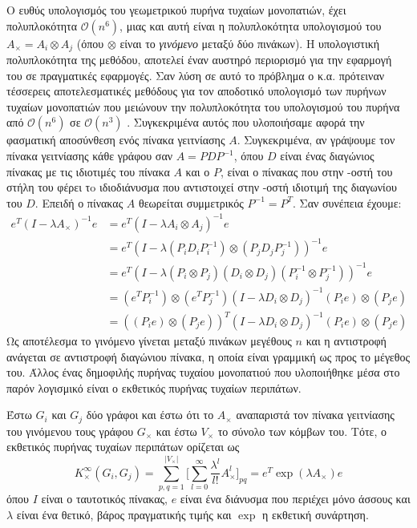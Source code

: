 Ο ευθύς υπολογισμός του γεωμετρικού πυρήνα τυχαίων μονοπατιών, έχει πολυπλοκότητα $\mathcal{O}(n^6)$, μιας και αυτή είναι η πολυπλοκότητα υπολογισμού του $A_{\times}=A_{i}\otimes A_{j}$ (όπου $\otimes$ είναι το \textit{γινόμενο } μεταξύ δύο πινάκων).
Η υπολογιστική πολυπλοκότητα της μεθόδου, αποτελεί έναν αυστηρό περιορισμό για την εφαρμογή του σε πραγματικές εφαρμογές.
Σαν λύση σε αυτό το πρόβλημα ο  κ.α. πρότειναν τέσσερεις αποτελεσματικές μεθόδους για τον αποδοτικό υπολογισμό των πυρήνων τυχαίων μονοπατιών  που μειώνουν την πολυπλοκότητα του υπολογισμού του πυρήνα από $\mathcal{O}(n^6)$ σε $\mathcal{O}(n^3)$ \cite{vishwanathan2010graph}.
Συγκεκριμένα αυτός που υλοποιήσαμε αφορά την φασματική αποσύνθεση ενός πίνακα γειτνίασης $A$.
Συγκεκριμένα, αν γράψουμε τον πίνακα γειτνίασης κάθε γράφου σαν $A=P D P^{-1}$, όπου $D$ είναι ένας διαγώνιος πίνακας με τις ιδιοτιμές του πίνακα $Α$ και ο $P$, είναι ο πίνακας που στην -οστή του στήλη του φέρει τo ιδιοδιάνυσμα που αντιστοιχεί στην -οστή ιδιοτιμή της διαγωνίου του $D$.
Επειδή ο πίνακας $A$ θεωρείται συμμετρικός $P^{-1}=P^{T}$.
Σαν συνέπεια έχουμε:
\begin{equation}
\begin{aligned}
    e^T(I - \lambda A_{\times})^{-1} e & = e^T(I - \lambda A_{i}\otimes A_{j})^{-1} e \\ & = e^T(I - \lambda (P_{i} D_{i} P^{-1}_{i})\otimes (P_{j} D_{j} P^{-1}_{j}))^{-1} e \\
    & = e^T(I - \lambda (P_{i} \otimes P_{j}) (D_{i} \otimes D_{j}) (P^{-1}_{i} \otimes P^{-1}_{j}))^{-1} e \\
    &= (e^T P_{i}^{-1})\otimes (e^T P_{j}^{-1})(I - \lambda D_{i} \otimes D_{j})^{-1} (P_{i} e) \otimes (P_{j} e) \\
    &= ((P_{i} e) \otimes (P_{j} e))^{T} (I - \lambda D_{i} \otimes D_{j})^{-1} (P_{i} e) \otimes (P_{j} e)
\end{aligned}
\end{equation}
Ως αποτέλεσμα το γινόμενο  γίνεται μεταξύ πινάκων μεγέθους $n$ και η αντιστροφή ανάγεται σε αντιστροφή διαγώνιου πίνακα, η οποία είναι γραμμική ως προς το μέγεθος του.
Άλλος ένας δημοφιλής πυρήνας τυχαίου μονοπατιού που υλοποιήθηκε μέσα στο παρόν λογισμικό είναι ο εκθετικός πυρήνας τυχαίων περιπάτων.
\begin{definition}
	Έστω $G_i$ και $G_j$ δύο γράφοι και έστω ότι το $A_\times$ αναπαριστά τον πίνακα γειτνίασης του γινόμενου τους γράφου $G_\times$ και έστω $V_\times$ το σύνολο των κόμβων του.
	Τότε, ο εκθετικός πυρήνας τυχαίων περιπάτων ορίζεται ως
	\begin{equation}
    	K_{\times}^{\infty}(G_i,G_j) = \sum_{p,q=1}^{|V_{\times}|} \Big[ \sum_{l=0}^{\infty} \frac{\lambda^l}{l!} A_{\times}^l \Big]_{pq} = e^T \exp(\lambda A_{\times}) e
    \end{equation}
	όπου $I$ είναι ο ταυτοτικός πίνακας, $e$ είναι ένα διάνυσμα που περιέχει μόνο άσσους και $\lambda$ είναι ένα θετικό, βάρος πραγματικής τιμής και $\exp$ η εκθετική συνάρτηση.
\end{definition}
